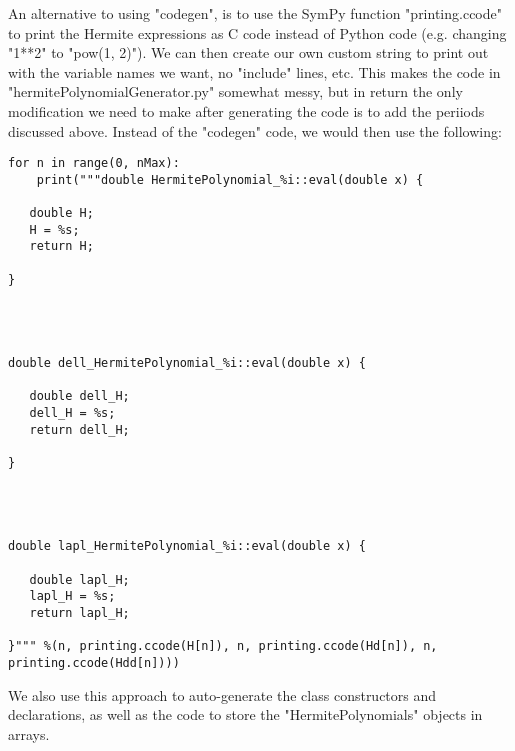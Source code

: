 \documentclass[../main.tex]{subfiles}
\begin{document}
\begin{appendices}
An alternative to using "codegen", is to use the SymPy function "printing.ccode" to print the Hermite expressions as C code instead of Python code (e.g. changing "1**2" to "pow(1, 2)"). We can then create our own custom string to print out with the variable names we want, no "include" lines,  etc. This makes the code in "hermitePolynomialGenerator.py" somewhat messy, but in return the only modification we need to make after generating the code is to add the periiods discussed above. Instead of the "codegen" code, we would then use the following:
\lstset{language=python}
\begin{lstlisting}[caption={}]
for n in range(0, nMax):
	print("""double HermitePolynomial_%i::eval(double x) {

   double H;
   H = %s;
   return H;

}




double dell_HermitePolynomial_%i::eval(double x) {

   double dell_H;
   dell_H = %s;
   return dell_H;

}




double lapl_HermitePolynomial_%i::eval(double x) {

   double lapl_H;
   lapl_H = %s;
   return lapl_H;

}""" %(n, printing.ccode(H[n]), n, printing.ccode(Hd[n]), n, printing.ccode(Hdd[n])))
\end{lstlisting}
We also use this approach to auto-generate the class constructors and declarations, as well as the code to store the "HermitePolynomials" objects in arrays.

\end{appendices}
\end{document}
